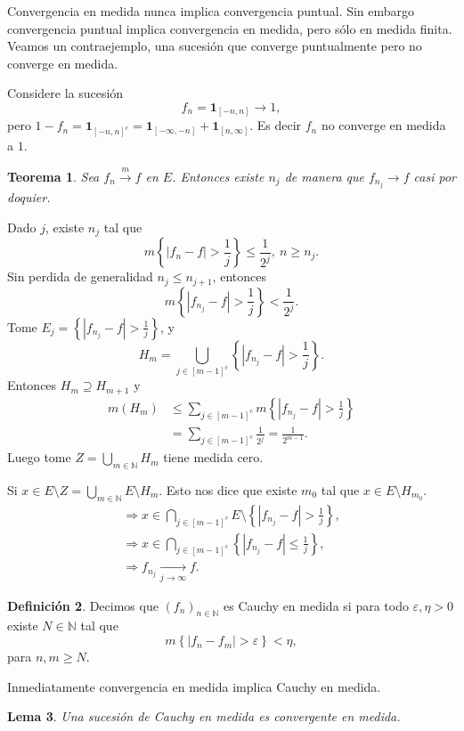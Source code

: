 \documentclass[12pt]{article}
\theoremstyle{plain}
\newtheorem{Th}{Teorema}[subsection]   %
\newtheorem{Lem}[Th]{Lema}             %
\theoremstyle{definition}
\newtheorem{Def}[Th]{Definición}       %
\theoremstyle{remark}
\numberwithin{equation}{section}
\newcommand{\bN}{\mathbb{N}}        %
\newcommand{\ind}{\mathbf{1}}       %
\renewcommand{\geq}{\geqslant}      %
\renewcommand{\leq}{\leqslant}      %
\renewcommand{\:}{\colon}           %
\newcommand{\conj}[1]{\left\lbrace#1\right\rbrace}
\newcommand{\bonj}[1]{\left\lbrack#1\right\rbrack}
\begin{document}
\begin{multicols}{2}
Convergencia en medida nunca implica convergencia puntual. Sin embargo convergencia puntual implica convergencia en medida, pero sólo en medida finita. Veamos un contraejemplo, una sucesión que converge puntualmente pero no converge en medida.\par
Considere la sucesión
$$f_n=\ind_{\bonj{-n,n}}\to 1,$$
pero $1-f_n=\ind_{\bonj{-n,n}^c}=\ind_{\bonj{-\infty,-n}}+\ind_{\bonj{n,\infty}}$. Es decir $f_n$ no converge en medida a $1$.

\begin{Th}
  Sea $f_n\xrightarrow[]{m}f$ en $E$. Entonces existe $n_j$ de manera que $f_{n_j}\to f$ casi por doquier.
\end{Th}

\begin{ptcbp}
Dado $j$, existe $n_j$ tal que
$$m\conj{|f_n-f|>\frac{1}{j}}\leq\frac{1}{2^j},\ n\geq n_j.$$
Sin perdida de generalidad $n_j\leq n_{j+1}$, entonces
$$m\conj{|f_{n_j}-f|>\frac{1}{j}} < \frac{1}{2^j}.$$
Tome $E_j=\conj{|f_{n_j}-f|>\frac{1}{j}}$, y
$$H_m=\bigcup_{j\in\bonj{m-1}^c}\conj{|f_{n_j}-f|>\frac{1}{j}}.$$
Entonces $H_m\supseteq H_{m+1}$ y
\begin{align*}
  m(H_m) &\leq \sum_{j\in\bonj{m-1}^c}m\conj{|f_{n_j}-f|>\frac{1}{j}}\\
  &=\sum_{j\in\bonj{m-1}^c}\frac{1}{2^j}=\frac{1}{2^{m-1}}.
\end{align*}
Luego tome $Z=\bigcup_{m\in\bN}H_m$ tiene medida cero.\par
Si $x\in E\setminus Z=\bigcup_{m\in\bN}E\setminus H_m$. Esto nos dice que existe $m_0$ tal que $x\in E\setminus H_{m_0}$.
\begin{gather*}
  \Rightarrow x\in\bigcap_{j\in\bonj{m-1}^c} E\setminus\conj{|f_{n_j}-f|>\frac{1}{j}},\\
  \Rightarrow x\in\bigcap_{j\in\bonj{m-1}^c} \conj{|f_{n_j}-f|\leq\frac{1}{j}},\\
  \Rightarrow f_{n_j}\xrightarrow[j\to\infty]{}f.
\end{gather*}
\end{ptcbp}
\begin{Def}
  Decimos que $(f_n)_{n\in\bN}$ es Cauchy en medida si para todo $\varepsilon,\eta>0$ existe $N\in\bN$ tal que
  $$m\conj{|f_n-f_m|>\varepsilon}<\eta,$$
  para $n,m\geq N$.
\end{Def}

Inmediatamente convergencia en medida implica Cauchy en medida.

\begin{Lem}
  Una sucesión de Cauchy en medida es convergente en medida.
\end{Lem}


\end{multicols}
\end{document}
